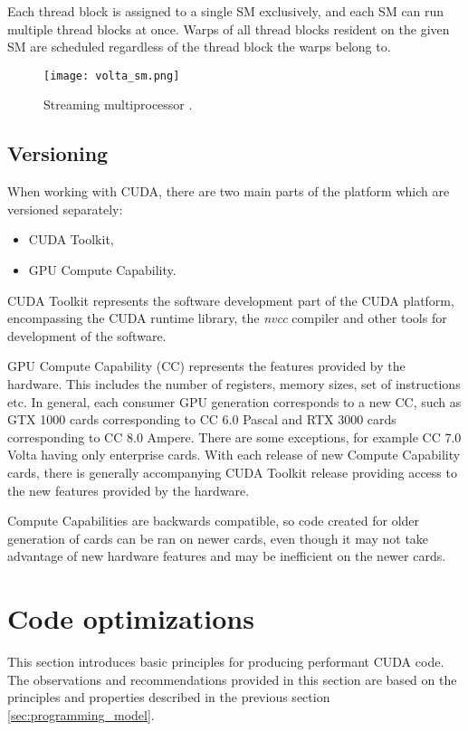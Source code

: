 Each thread block is assigned to a single SM exclusively, and each SM can run multiple thread blocks at once. Warps of all thread blocks resident on the given SM are scheduled regardless of the thread block the warps belong to.


\begin{figure}[h]
	\centering
	\texttt{[image: volta\_sm.png]}
	\caption{Streaming multiprocessor \citep{paper:volta}.}
	\label{fig:volta_sm}
\end{figure}

\subsection{Versioning}

When working with CUDA, there are two main parts of the platform which are versioned separately: %
\begin{itemize}
	\item CUDA Toolkit,
	\item GPU Compute Capability.
\end{itemize}

CUDA Toolkit represents the software development part of the CUDA platform, encompassing the CUDA runtime library, the \textit{nvcc} compiler and other tools for development of the software.

GPU Compute Capability (CC) represents the features provided by the hardware. This includes the number of registers, memory sizes, set of instructions etc. In general, each consumer GPU generation corresponds to a new CC, such as GTX 1000 cards corresponding to CC 6.0 Pascal and RTX 3000 cards corresponding to CC 8.0 Ampere. There are some exceptions, for example CC 7.0 Volta having only enterprise cards. With each release of new Compute Capability cards, there is generally accompanying CUDA Toolkit release providing access to the new features provided by the hardware. 

Compute Capabilities are backwards compatible, so code created for older generation of cards can be ran on newer cards, even though it may not take advantage of new hardware features and may be inefficient on the newer cards.

\section{Code optimizations}


This section introduces basic principles for producing performant CUDA code.
The observations and recommendations provided in this section are based on the principles and properties described in the previous section \ref{sec:programming_model}.

